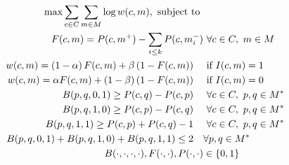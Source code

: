 \documentclass[a4paper,USenglish]{article}
\theoremstyle{definition}
\begin{document}
\begin{align}
  \max \sum_{c\in C}\sum_{m\in M}\log w(c,m),\text{ subject to }&\notag\\
  F(c,m) = P(c,m^{+}) - \sum_{i\le k} P(c, m_{i}^{-}) &\ \forall c\in C,\ m\in M\label{eq:def-F}\\
  w(c,m) = \left(1 - \alpha\right) F(c,m) +  \beta \left( 1 - F(c,m) \right)\quad&\text{ if } I(c,m) = 1\label{eq:cost-FP}\\
  w(c,m) = \alpha F(c,m) +  \left(1 - \beta\right) \left( 1 - F(c,m) \right)\quad&\text{ if } I(c,m) = 0\label{eq:cost-FN}\\
  B(p,q,0,1)\ge P(c,q) - P(c,p) \quad&\ \forall c\in C,\ p,q\in M^{*}\label{eq:case-01}\\
  B(p,q,1,0)\ge P(c,p) - P(c,q) \quad&\ \forall c\in C,\ p,q\in M^{*}\label{eq:case-10}\\
  B(p,q,1,1)\ge P(c,p) + P(c,q) -1 \quad&\ \forall  c\in C,\ p,q\in M^{*}\label{eq:case-11}\\
  B(p,q,0,1) + B(p,q,1,0) + B(p,q,1,1)\le 2  \quad&\forall  p,q\in M^{*}\label{eq:no-conflict}\\
  B(\cdot,\cdot,\cdot,\cdot), F(\cdot,\cdot), P(\cdot,\cdot)&\in \{0,1\}\notag
\end{align}



\end{document}
